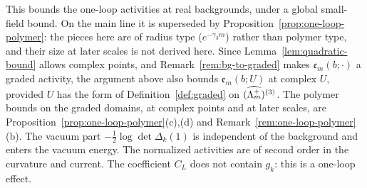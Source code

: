 This bounds the one-loop activities at real backgrounds, under a global small-field bound. On the main line it is superseded by Proposition~\ref{prop:one-loop-polymer}: the pieces here are of radius type ($e^{-\gamma_3m}$) rather than polymer type, and their size at later scales is not derived here. Since Lemma~\ref{lem:quadratic-bound} allows complex points, and Remark~\ref{rem:bg-to-graded} makes $\mathfrak e_m(b;\cdot)$ a graded activity, the argument above also bounds $\mathfrak e_m(b;U)$ at complex $U$, provided $U$ has the form of Definition~\ref{def:graded} on $(\widehat{\Lambda_m^+})^{(3)}$. The polymer bounds on the graded domains, at complex points and at later scales, are Proposition~\ref{prop:one-loop-polymer}(c),(d) and Remark~\ref{rem:one-loop-polymer}(b). The vacuum part $-\frac12\log\det\Delta_k(1)$ is independent of the background and enters the vacuum energy. The normalized activities are of second order in the curvature and current. The coefficient $C_L$ does not contain $g_k$: this is a one-loop effect.
